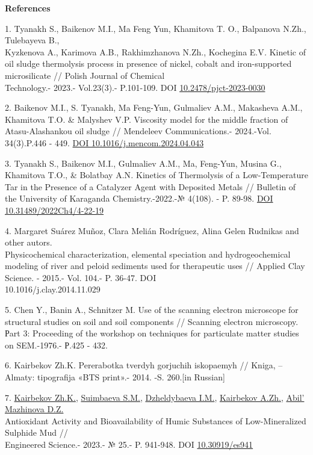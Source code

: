 \begin{center}
{\bfseries References}
\end{center}

\begin{references}
1. Tyanakh S., Baikenov M.I., Ma Feng Yun, Khamitova T. O., Balpanova
N.Zh., Tulebayeva B., \\Kyzkenova A., Karimova A.B., Rakhimzhanova N.Zh.,
Kochegina E.V\emph{.} Kinetic of oil sludge thermolysis process in
presence of nickel, cobalt and iron-supported microsilicate // Polish
Journal of Chemical \\Technology.- 2023.- Vol.23(3).- P.101-109. DOI
\href{https://doi.org/10.2478/pjct-2023-0030}{10.2478/pjct-2023-0030}

2. Baikenov M.I., S. Tyanakh, Ma Feng-Yun, Gulmaliev A.M., Makasheva
A.M., Khamitova T.O. \& Malyshev V.P. Viscosity model for the middle
fraction of Atasu-Alashankou oil sludge // Mendeleev Communications.-
2024.-Vol. 34(3).P.446 - 449.
\href{https://doi.org/10.1016/j.mencom.2024.04.043}{DOI
10.1016/j.mencom.2024.04.043}

3. Tyanakh S., Baikenov M.I., Gulmaliev A.M., Ma, Feng-Yun, Musina G.,
Khamitova T.O., \& Bolatbay A.N\emph{.} Kinetics of Thermolysis of a
Low-Temperature Tar in the Presence of a Catalyzer Agent with Deposited
Metals // Bulletin of the University of Karaganda Chemistry.-2022.-№
4(108). - P. 89-98. \href{https://doi.org/10.31489/2022Ch4/4-22-19}{DOI
10.31489/2022Ch4/4-22-19}

4. Margaret Suárez Muñoz, Clara Melián Rodríguez, Alina Gelen Rudnikas
and other autors. \\Physicochemical characterization, elemental speciation
and hydrogeochemical modeling of river and peloid sediments used for
therapeutic uses // Applied Clay Science. - 2015.- Vol. 104.- P. 36-47.
DOI \\10.1016/j.clay.2014.11.029

5. Chen Y., Banin A., Schnitzer M. Use of the scanning electron
microscope for structural studies on soil and soil components //
Scanning electron microscopy. Рart 3: Proceeding of the workshop on
techniques for particulate matter studies on SEM.-1976.- Р.425 - 432.

6. Kairbekov Zh.K. Pererabotka tverdyh gorjuchih iskopaemyh // Kniga, --
Almaty: tipografija «BTS print».- 2014. -S. 260.{[}in Russian{]}

7.
\href{https://www.scopus.com/authid/detail.uri?authorId=55910705200}{Kairbekov
Zh.K.},
\href{https://www.scopus.com/authid/detail.uri?authorId=57201691853}{Suimbaeva
S.M.},
\href{https://www.scopus.com/authid/detail.uri?authorId=56600659100}{Dzheldybaeva
I.M.},
\href{https://www.scopus.com/authid/detail.uri?authorId=56600640700}{Kairbekov
A.Zh.},
\href{https://www.scopus.com/authid/detail.uri?authorId=58021595400}{Abil' Mazhinova
D.Z.} \\Antioxidant Activity and Bioavailability of Humic Substances of
Low-Mineralized Sulphide Mud // \\Engineered Science.- 2023.- № 25.- P.
941-948. DOI \href{http://dx.doi.org/10.30919/es941}{10.30919/es941}


\end{references}
